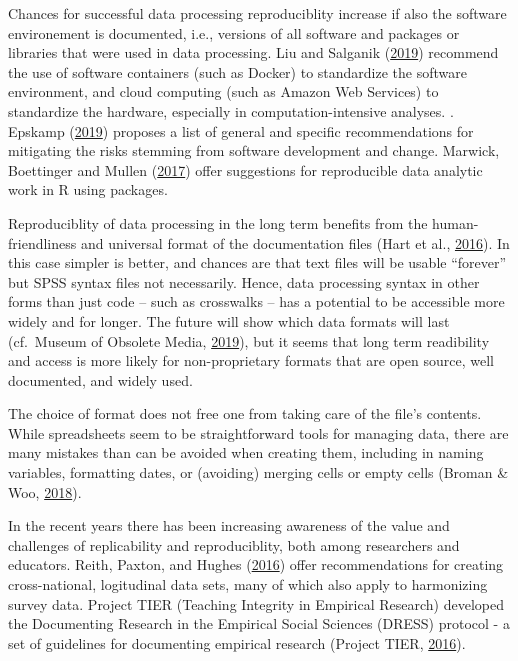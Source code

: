 \documentclass[12pt,]{article}
\begin{document}
Chances for successful data processing reproduciblity increase if also the software environement is documented, i.e., versions of all software and packages or libraries that were used in data processing. Liu and Salganik (\protect\hyperlink{ref-Liu2019}{2019}) recommend the use of software containers (such as Docker) to standardize the software environment, and cloud computing (such as Amazon Web Services) to standardize the hardware, especially in computation-intensive analyses. . Epskamp (\protect\hyperlink{ref-Epskamp2019}{2019}) proposes a list of general and specific recommendations for mitigating the risks stemming from software development and change. Marwick, Boettinger and Mullen (\protect\hyperlink{ref-Marwick2017}{2017}) offer suggestions for reproducible data analytic work in R using packages.

Reproduciblity of data processing in the long term benefits from the human-friendliness and universal format of the documentation files (Hart et al., \protect\hyperlink{ref-Hart2016}{2016}). In this case simpler is better, and chances are that text files will be usable ``forever'' but SPSS syntax files not necessarily. Hence, data processing syntax in other forms than just code -- such as crosswalks -- has a potential to be accessible more widely and for longer. The future will show which data formats will last (cf.~Museum of Obsolete Media, \protect\hyperlink{ref-MuseumofObsoleteMedia2019}{2019}), but it seems that long term readibility and access is more likely for non-proprietary formats that are open source, well documented, and widely used.

The choice of format does not free one from taking care of the file's contents. While spreadsheets seem to be straightforward tools for managing data, there are many mistakes than can be avoided when creating them, including in naming variables, formatting dates, or (avoiding) merging cells or empty cells (Broman \& Woo, \protect\hyperlink{ref-Broman2018}{2018}).

In the recent years there has been increasing awareness of the value and challenges of replicability and reproduciblity, both among researchers and educators. Reith, Paxton, and Hughes (\protect\hyperlink{ref-Reith2016}{2016}) offer recommendations for creating cross-national, logitudinal data sets, many of which also apply to harmonizing survey data. Project TIER (Teaching Integrity in Empirical Research) developed the Documenting Research in the Empirical Social Sciences (DRESS) protocol - a set of guidelines for documenting empirical research (Project TIER, \protect\hyperlink{ref-ProjectTIER2016}{2016}).
\end{document}
